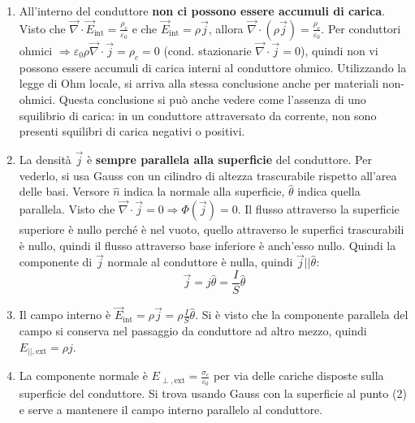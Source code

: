 \documentclass[10pt, a4paper]{scrartcl}
\numberwithin{equation}{subsection}
\theoremstyle{style1}
\begin{document}
\begin{enumerate}
	\item All'interno del conduttore \textbf{non ci possono essere accumuli di carica}. Visto che $\vec{\nabla }\cdot \vec{E}_\text{int} = \frac{\rho_c }{\varepsilon _0}$ e che $\vec{E}_\text{int} = \rho  \vec{j}$, allora $\vec{\nabla }\cdot  (\rho \vec{j}) = \frac{\rho _c}{\varepsilon _0}$. Per conduttori ohmici $\Rightarrow \varepsilon _0 \rho \vec{\nabla }\cdot \vec{j} = \rho _c = 0$ (cond. stazionarie $\vec{\nabla }\cdot \vec{j}=0$), quindi non vi possono essere accumuli di carica interni al conduttore ohmico. Utilizzando la legge di Ohm locale, si arriva alla stessa conclusione anche per materiali non-ohmici. Questa conclusione si pu\`o anche vedere come l'assenza di uno squilibrio di carica: in un conduttore attraversato da corrente, non sono presenti squilibri di carica negativi o positivi.

	\item La densit\`a $\vec{j}$ \`e \textbf{sempre parallela alla superficie} del conduttore. Per vederlo, si usa Gauss con un cilindro di altezza trascurabile rispetto all'area delle basi. Versore $\hat{n}$ indica la normale alla superficie, $\hat{\theta }$ indica quella parallela. Visto che $\vec{\nabla }\cdot \vec{j}=0\Rightarrow \Phi(\vec{j}) = 0$. Il flusso attraverso la superficie superiore \`e nullo perch\'e \`e nel vuoto, quello attraverso le superfici trascurabili \`e nullo, quindi il flusso attraverso base inferiore \`e anch'esso nullo. Quindi la componente di $\vec{j}$ normale al conduttore \`e nulla, quindi $\vec{j} ||\hat{\theta }$:
		\begin{equation}
			\vec{j} = j \hat{\theta } = \frac{I}{S}\hat{\theta }
		\end{equation}
	\item Il campo interno \`e $\vec{E}_\text{int}= \rho  \vec{j} = \rho \frac{I}{S}\hat{\theta }$. Si \`e visto che la componente parallela del campo si conserva nel passaggio da conduttore ad altro mezzo, quindi $E_{| |, \text{ext}} = \rho j$.
	\item La componente normale \`e $E_{\perp, \text{ext}} = \frac{\sigma_c}{\varepsilon _0}$ per via delle cariche disposte sulla superficie del conduttore. Si trova usando Gauss con la superficie al punto (2) e serve a mantenere il campo interno parallelo al conduttore.
\end{enumerate}
\end{document}
